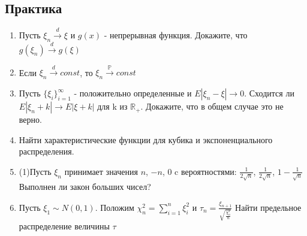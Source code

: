 \documentclass[a4paper, 14pt]{extarticle}
\begin{document}
\subsection*{Практика}
\begin{enumerate}

\item Пусть $\xi_n \overset{d}{\to} \xi$ и $g(x)$ - непрерывная функция. Докажите, что $g(\xi_n) \overset{d}{\to} g(\xi)$

\item Если $\xi_n \overset{d}{\to} const$, то $\xi_n \overset{\mathbb{P}}{\to} const$

\item Пусть $\{\xi_i\}_{i=1}^{\infty}$ - положительно определенные и $E|\xi_n - \xi| \to 0$. 
Сходится ли $E|\xi_n + k| \to E|\xi+k|$ для k из $\mathbb{R_{+}}$. 
Докажите, что в общем случае это не верно.

\item Найти характеристические функции для кубика и экспоненциального распределения.

\item (1)Пусть $\xi_n$ принимает значения $n$, $-n$, 0 c вероятностями:
$\frac{1}{2\sqrt{n}}$, $\frac{1}{2\sqrt{n}}$, $1 - \frac{1}{\sqrt{n}}$
Выполнен ли закон больших чисел?

\item Пусть $\xi_1 \sim N(0,1)$. Положим $\chi_n^2 = \sum_{i=1}^{n}\xi_i^2$ и $\tau_n = \frac{\xi_{n+1}}{\sqrt{\frac{\chi_n^2}{n}}}$
Найти предельное распределение величины $\tau$

\end{enumerate}
\newpage
\end{document}
